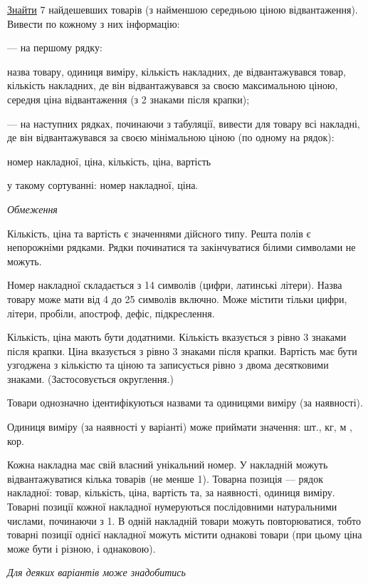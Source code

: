 \documentclass[11pt, ukrainian]{article}
\begin{document}
\underline{Знайти} 7 найдешевших товарів (з найменшою середньою ціною відвантаження). Вивести по кожному з них інформацію:\par
{\noindent}--- на першому рядку:\par
назва товару, одиниця виміру, кількість накладних, де відвантажувався товар, кількість накладних, де він відвантажувався за своєю максимальною ціною, середня ціна відвантаження (з 2 знаками після крапки);

{\noindent}--- на наступних рядках, починаючи з табуляції, вивести для товару всі накладні, де він відвантажувався за своєю мінімальною ціною (по одному на рядок):\par
номер накладної, ціна, кількість, ціна, вартість

{\noindent}у такому сортуванні: номер накладної, ціна.


\bigskip\textit{Обмеження}

Кількість, ціна та вартість є значеннями дійсного типу.
Решта полів є непорожніми рядками.
Рядки починатися та закінчуватися білими символами не можуть.

Номер накладної складається з 14 символів (цифри, латинські літери).
Назва товару може мати від 4 до 25 символів включно.
Може містити тільки цифри, літери, пробіли, апостроф, дефіс, підкреслення.

Кількість, ціна мають бути додатними.
Кількість вказується з рівно 3 знаками після крапки.
Ціна вказується з рівно 3 знаками після крапки.
Вартість має бути узгоджена з кількістю та ціною та записується рівно з двома десятковими знаками.
(Застосовується округлення.)

Товари однозначно ідентифікуються назвами та одиницями виміру (за наявності).

Одиниця виміру (за наявності у варіанті) може приймати значення: шт., кг, м , кор.

Кожна накладна має свій власний унікальний номер.
У накладній можуть відвантажуватися кілька товарів (не менше 1).
Товарна позиція --- рядок накладної: товар, кількість, ціна, вартість та, за наявності, одиниця виміру.
Товарні позиції кожної накладної нумеруються послідовними натуральними числами, починаючи з 1.
В одній накладній товари можуть повторюватися, 
тобто товарні позиції однієї накладної можуть містити однакові товари 
(при цьому ціна може бути і різною, і однаковою).

\bigskip\textit{Для деяких варіантів може знадобитись}
\end{document}
